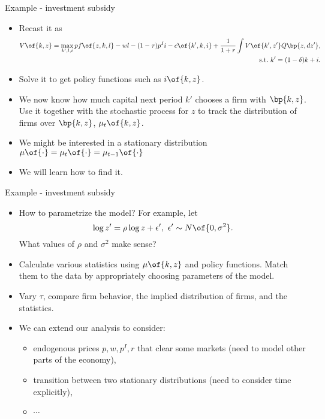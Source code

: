 \documentclass[11pt,xcolor={dvipsnames},aspectratio=159,hyperref={pdftex,pdfpagemode=UseNone,hidelinks,pdfdisplaydoctitle=true},usepdftitle=false]{beamer}
\begin{document}
\begin{frame}{Example - investment subsidy}
    \begin{itemize}
     \item Recast it as \begin{align*}
        V\of{k,z} = \max_{k',l,i} \mleftright{ p f\of{z,k,l} - wl - (1-\tau) p^I i - c\of{k',k,i} + \frac{1}{1+r} \int V\of{k',z'} Q\bp{z,dz'} }, \\ \text{s.t.} \ k' = (1-\delta) k + i.
     \end{align*} 
        \item Solve it to get policy functions such as $i\of{k,z}$. 
        \item We now know how much capital next period $k'$ chooses a firm with $\bp{k,z}$. Use it together with the stochastic process for $z$ to track the distribution of firms over $\bp{k,z}$, $\mu_t\of{k,z}$.
        \item We might be interested in a stationary distribution $\mu \of{\cdot} = \mu_{t} \of{\cdot} = \mu_{t-1} \of{\cdot}$
        \item We will learn how to find it. 
    \end{itemize}
\end{frame}


\begin{frame}{Example - investment subsidy}
    \begin{itemize}
         \item How to parametrize the model? For example, let $$\log{z'} = \rho \log{z} + \epsilon', \ \epsilon' \sim N\of{0,\sigma^2}.$$ What values of $\rho$ and $\sigma^2$ make sense?  
        \item Calculate various statistics using $\mu\of{k,z}$ and policy functions. Match them to the data by appropriately choosing parameters of the model.
        \item Vary $\tau$, compare firm behavior, the implied distribution of firms, and the statistics.
        \item We can extend our analysis to consider: \begin{itemize}
        \item endogenous prices $p,w,p^I,r$ that clear some markets (need to model other parts of the economy),
        \item transition between two stationary distributions (need to consider time explicitly),
        \item $\cdots$
        \end{itemize}
    \end{itemize}
\end{frame}
\end{document}
